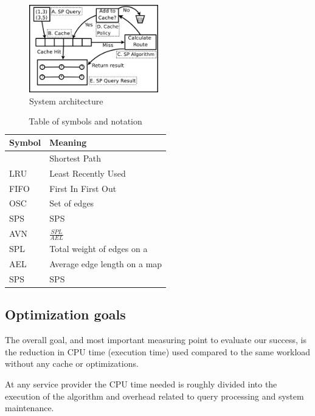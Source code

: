 \begin{figure}
  \center
	\includegraphics[width=0.5\textwidth]{figures/advancedroutequery.pdf}
	\caption{System architecture}
  \label{fig:advancedroutequery}
\end{figure}

\begin{table}
\begin{tabular*}{\columnwidth}{|l||p{}|}
\hline
Symbol		& Meaning \\\hline
\spath		& Shortest Path \\\hline
LRU		& Least Recently Used \\\hline
FIFO		& First In First Out \\\hline
OSC		& Set of edges \\\hline
\acs{SPS} 	& \acl{SPS} \\\hline
AVN 		& $\frac{SPL}{AEL}$ \\\hline
SPL	 	& Total weight of edges on a \spath \\\hline
AEL	 	& Average edge length on a map \\\hline
\acs{SPS} 	& \acl{SPS} \\\hline
\end{tabular*}
\caption{Table of symbols and notation} 
\label{tab:symbols}
\end{table}



\subsection{Optimization goals}\label{subsec:goals}

The overall goal, and most important measuring point to evaluate our success, is the reduction in CPU time (execution time) used compared to the same workload without any cache or optimizations.

At any \spath service provider the CPU time needed is roughly divided into the execution of the \spath algorithm and overhead related to query processing and system maintenance. 

